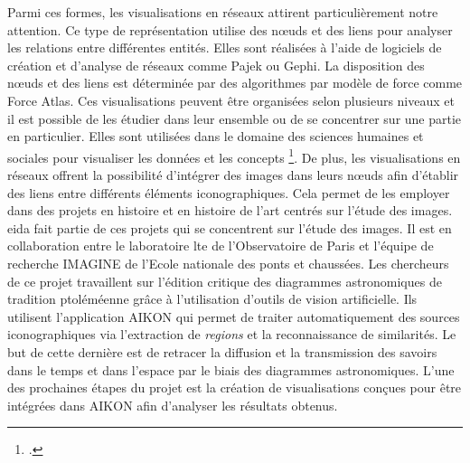 \documentclass[a4paper,12pt,twoside]{book}
\begin{document}
	Parmi ces formes, les visualisations en réseaux attirent particulièrement notre attention. Ce type de représentation utilise des nœuds et des liens pour analyser les relations entre différentes entités. Elles sont réalisées à l'aide de logiciels de création et d'analyse de réseaux comme Pajek ou Gephi. La disposition des nœuds et des liens est déterminée par des algorithmes par modèle de force comme Force Atlas. Ces visualisations peuvent être organisées selon plusieurs niveaux et il est possible de les étudier dans leur ensemble ou de se concentrer sur une partie en particulier. Elles sont utilisées dans le domaine des sciences humaines et sociales pour visualiser les données et les concepts \footcite{cristofoliPrincipesUsagesDessins2015}. De plus, les visualisations en réseaux offrent la possibilité d'intégrer des images dans leurs nœuds afin d'établir des liens entre différents éléments iconographiques. Cela permet de les employer dans des projets en histoire et en histoire de l'art centrés sur l'étude des images.\\
	
	\gls{eida} fait partie de ces projets qui se concentrent sur l'étude des images. Il est en collaboration entre le laboratoire \gls{lte} de l'Observatoire de Paris et l'équipe de recherche IMAGINE de l'Ecole nationale des ponts et chaussées. Les chercheurs de ce projet travaillent sur l'édition critique des diagrammes astronomiques de tradition ptoléméenne grâce à l'utilisation d'outils de vision artificielle. Ils utilisent l'application AIKON qui permet de traiter automatiquement des sources iconographiques via l'extraction de \textit{regions} et la reconnaissance de similarités. Le but de cette dernière est de retracer la diffusion et la transmission des savoirs dans le temps et dans l'espace par le biais des diagrammes astronomiques. L'une des prochaines étapes du projet est la création de visualisations conçues pour être intégrées dans AIKON afin d'analyser les résultats obtenus.\\
\end{document}
